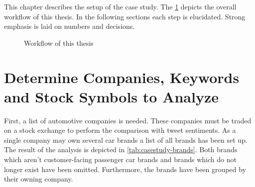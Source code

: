 
This chapter describes the setup of the case study.
The \cref{fig:casestudy-workflow} depicts the overall workflow of this thesis.
In the following sections each step is elucidated.
Strong emphasis is laid on numbers and decisions.

\begin{figure}[ht]
  \centering


  \caption{Workflow of this thesis}
  \label{fig:casestudy-workflow}
\end{figure}

\section{Determine Companies, Keywords and Stock Symbols to Analyze}
\label{s:casestudy-companieskeywords}

First, a list of automotive companies is needed.
These companies must be traded on a stock exchange to perform the comparison with tweet sentiments.
As a single company may own several car brands a list of all brands has been set up.
The result of the analysis is depicted in \cref{tab:casestudy-brands}.
Both brands which aren't customer-facing passenger car brands and brands which do not longer exist have been omitted.
Furthermore, the brands have been grouped by their owning company.

